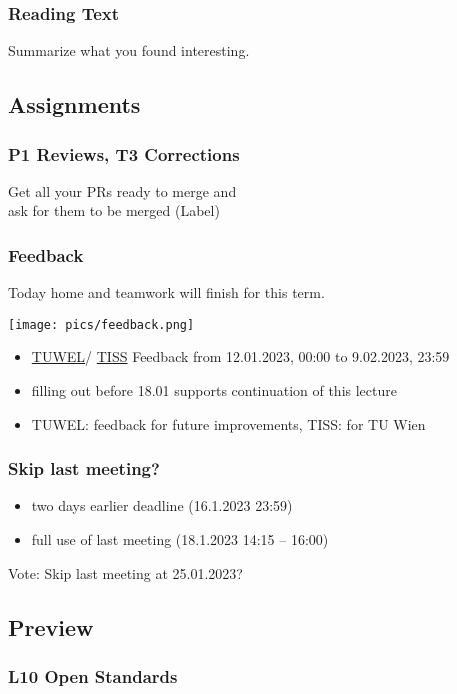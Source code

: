 \begin{assignment}
	\frametitle{Reading Text}

	\begin{task}
	Summarize what you found interesting.
	\end{task}
\end{assignment}

\breakframe

\subsection{Assignments}

\begin{frame}
	\frametitle{P1 Reviews, T3 Corrections}

	\begin{task}
	Get all your PRs ready to merge and \\
	ask for them to be merged (Label)
	\end{task}
\end{frame}

\begin{frame}
	\frametitle{Feedback}
	Today home and teamwork will finish for this term.

	\hfill \texttt{[image: pics/feedback.png]}
	\vspace{-1cm}
	\begin{itemize}[<+-| alert@+>]
		\item \href{https://tuwel.tuwien.ac.at/mod/feedback/view.php?id=1661074}{TUWEL}/
			\href{https://tiss.tuwien.ac.at/survey/surveyForm.xhtml?courseNumber=194114&semesterCode=2022W}{TISS}
			Feedback from 12.01.2023, 00:00 to 9.02.2023, 23:59
		\item filling out before 18.01 supports continuation of this lecture
		\item TUWEL: feedback for future improvements, TISS: for TU Wien
	\end{itemize}
\end{frame}

\begin{frame}
	\frametitle{Skip last meeting?}

	\begin{itemize}
	\item two days earlier deadline (16.1.2023 23:59)
	\item full use of last meeting (18.1.2023 14:15 -- 16:00)
	\end{itemize}

	\begin{task}
	Vote: Skip last meeting at 25.01.2023?
	\end{task}
\end{frame}

\subsection{Preview}

\begin{frame}
	\frametitle{L10 Open Standards}
\end{frame}

\appendix

\begin{frame}[allowframebreaks]
	
	
\end{frame}



